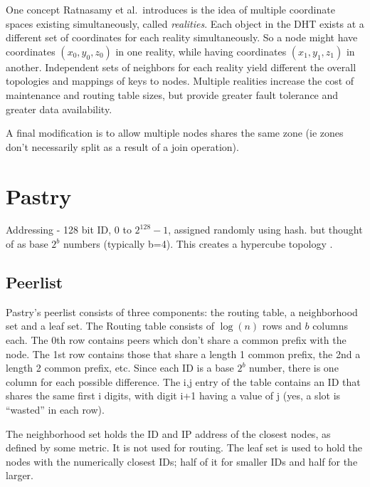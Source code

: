 \documentclass[10pt,letterpaper]{report}
\begin{document}
One concept Ratnasamy et al.\  introduces is the idea of multiple coordinate spaces existing simultaneously, called \textit{realities}. 
Each object in the DHT exists at a different set of coordinates for each reality simultaneously.
So a node might have coordinates $(x_0,y_0,z_0)$ in one reality, while having coordinates $(x_1,y_1,z_1)$ in another.
Independent sets of neighbors for each reality yield different the overall topologies and mappings of keys to nodes.
Multiple realities increase the cost of maintenance and routing table sizes, but provide greater fault tolerance and greater data availability.
 
A final  modification is to allow multiple nodes shares the same zone (ie zones don't necessarily split as a result of a join operation).    












\section{Pastry}

Addressing - 128 bit ID, 0 to $2^128 -1$, assigned randomly using hash.   but thought of as base $2^b$ numbers (typically b=4).  This creates a hypercube topology \cite{induced}.

\subsection*{Peerlist}
Pastry's peerlist consists of three components: the routing table, a neighborhood set and a leaf set.  
The Routing table consists of $\log(n)$ rows and $b$ columns each. 
The 0th row contains peers which don't share a common prefix with the node.  
The 1st row contains those that share a length 1 common prefix, the 2nd a length 2 common prefix, etc.  
Since each ID is a base $2^b$ number, there is one column for each possible difference.   The i,j entry of the table contains an ID that shares the same first i digits, with digit i+1 having a value of j (yes, a slot is ``wasted'' in each row).

The neighborhood set holds the ID and IP address of the closest nodes, as defined by some metric.  
It is not used for routing.  
The leaf set is used to hold the nodes with the numerically closest IDs;  half of it for smaller IDs and half for the larger.
\end{document}
